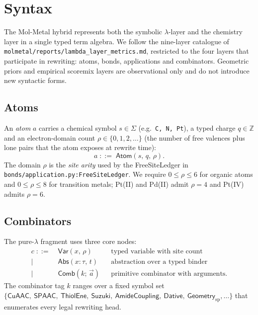 \appendix

\section{Syntax}
\label{sec:syntax}
The Mol-Metal hybrid represents both the symbolic $\lambda$-layer and the
chemistry layer in a single typed term algebra. We follow the nine-layer
catalogue of \texttt{molmetal/reports/lambda\_layer\_metrics.md}, restricted
to the four layers that participate in rewriting: atoms, bonds, applications
and combinators. Geometric priors and empirical scoremix layers are
observational only and do not introduce new syntactic forms.

\subsection{Atoms}
An \emph{atom} $a$ carries a chemical symbol $s \in \Sigma$ (e.g.\ \texttt{C, N, Pt}),
a typed charge $q \in \mathbb{Z}$ and an electron-domain count
$\rho \in \{0,1,2,\dots\}$ (the number of free valences plus lone pairs that
the atom exposes at rewrite time):
\[
  a \;::=\; \mathsf{Atom}(s,\,q,\,\rho).
\]
The domain $\rho$ is the \emph{site arity} used by the FreeSiteLedger in
\texttt{bonds/application.py:FreeSiteLedger}. We require $0 \le \rho \le 6$
for organic atoms and $0 \le \rho \le 8$ for transition metals; Pt(II) and
Pd(II) admit $\rho=4$ and Pt(IV) admits $\rho=6$.

\subsection{Combinators}
The pure-$\lambda$ fragment uses three core nodes:
\begin{align*}
  c \;::=\;& \mathsf{Var}(x,\,\rho)       && \text{typed variable with site count} \\
           \mid\;& \mathsf{Abs}(x{:}\tau,\,t) && \text{abstraction over a typed binder} \\
           \mid\;& \mathsf{Comb}(k;\,\vec a)  && \text{primitive combinator with arguments.}
\end{align*}
The combinator tag $k$ ranges over a fixed symbol set
$\{ \mathsf{CuAAC},\ \mathsf{SPAAC},\ \mathsf{ThiolEne},\ \mathsf{Suzuki},\
\mathsf{AmideCoupling},\ \mathsf{Dative},\ \mathsf{Geometry}_{\mathrm{sp}},\dots\}$
that enumerates every legal rewriting head.

